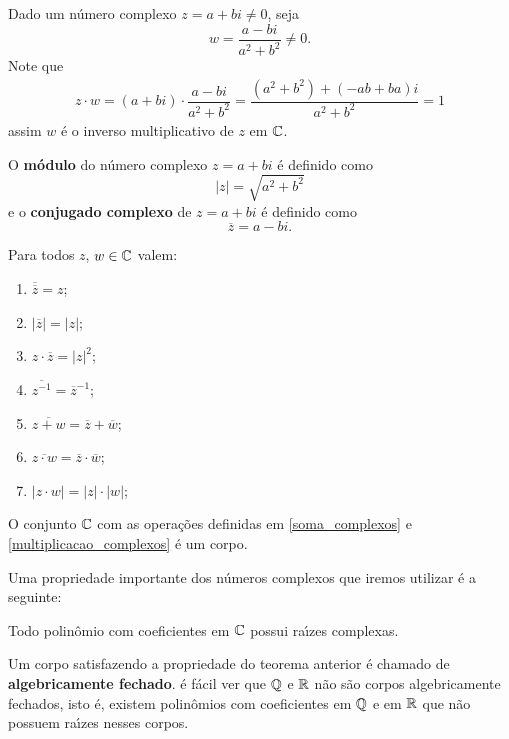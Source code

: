 Dado um número complexo $z = a + bi \ne 0$, seja
\[
  w = \dfrac{a - bi}{a^2 + b^2} \ne 0.
\]
Note que
\begin{align*}
  z\cdot w = (a + bi)\cdot \dfrac{a - bi}{a^2 + b^2} = \dfrac{(a^2 + b^2) + (-ab + ba)i}{a^2 + b^2} = 1
\end{align*}
assim $w$ é o inverso multiplicativo de $z$ em $\mathbb{C}$.

O \textbf{m\'odulo} do número complexo $z = a + bi$ é definido como
\[
  |z| = \sqrt{a^2 + b^2}
\]
e o \textbf{conjugado complexo} de $z = a + bi$ é definido como
\[
  \overline{z} = a - bi.
\]

\begin{proposicao}
  Para todos $z$, $w \in \mathbb{C}$ valem:
  \begin{enumerate}[label={\roman*})]
    \item $\overline{\overline{z}} = z$;
    \item $|\overline{z}| = |z|$;
    \item $z\cdot\overline{z} = |z|^2$;
    \item $\overline{z^{-1}} = \overline{z}^{-1}$;
    \item $\overline{z + w} = \overline{z} + \overline{w}$;
    \item $\overline{z \cdot w} = \overline{z} \cdot \overline{w}$;
    \item $|z \cdot w| = |z| \cdot |w|$;
  \end{enumerate}
\end{proposicao}

\begin{proposicao}
  O conjunto $\mathbb{C}$ com as operações definidas em \eqref{soma_complexos} e \eqref{multiplicacao_complexos} é um corpo.
\end{proposicao}

Uma propriedade importante dos números complexos que iremos utilizar é a seguinte:
\begin{teorema}
  Todo polin\^omio com coeficientes em $\mathbb{C}$ possui ra{\'\i}zes complexas.
\end{teorema}

\begin{observacao}
  Um corpo satisfazendo a propriedade do teorema anterior é chamado de \textbf{algebricamente fechado}. é fácil ver que $\mathbb{Q}$ e $\mathbb{R}$ não são corpos algebricamente fechados, isto é, existem polin\^omios com coeficientes em $\mathbb{Q}$ e em $\mathbb{R}$ que não possuem ra{\'\i}zes nesses corpos.
\end{observacao}
